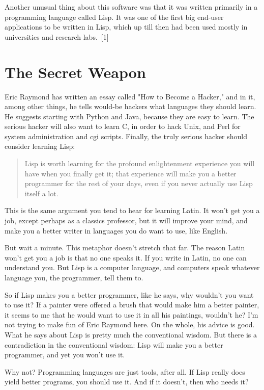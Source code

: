 \documentclass[10pt,twoside,openright]{memoir}
\begin{document}
Another unusual thing about this software was that it was written primarily in a programming language called Lisp. It was one of the first big end-user applications to be written in Lisp, which up till then had been used mostly in universities and research labs.~[1]

\section{The Secret Weapon}

Eric Raymond has written an essay called "How to Become a Hacker," and in it, among other things, he tells would-be hackers what languages they should learn. He suggests starting with Python and Java, because they are easy to learn. The serious hacker will also want to learn C, in order to hack Unix, and Perl for system administration and cgi scripts. Finally, the truly serious hacker should consider learning Lisp:

\begin{quote}
Lisp is worth learning for the profound enlightenment experience you will have when you finally get it; that experience will make you a better programmer for the rest of your days, even if you never actually use Lisp itself a lot.
\end{quote}

This is the same argument you tend to hear for learning Latin. It won't get you a job, except perhaps as a classics professor, but it will improve your mind, and make you a better writer in languages you do want to use, like English.

But wait a minute. This metaphor doesn't stretch that far. The reason Latin won't get you a job is that no one speaks it. If you write in Latin, no one can understand you. But Lisp is a computer language, and computers speak whatever language you, the programmer, tell them to.

So if Lisp makes you a better programmer, like he says, why wouldn't you want to use it? If a painter were offered a brush that would make him a better painter, it seems to me that he would want to use it in all his paintings, wouldn't he? I'm not trying to make fun of Eric Raymond here. On the whole, his advice is good. What he says about Lisp is pretty much the conventional wisdom. But there is a contradiction in the conventional wisdom: Lisp will make you a better programmer, and yet you won't use it.

Why not? Programming languages are just tools, after all. If Lisp really does yield better programs, you should use it. And if it doesn't, then who needs it?
\end{document}
